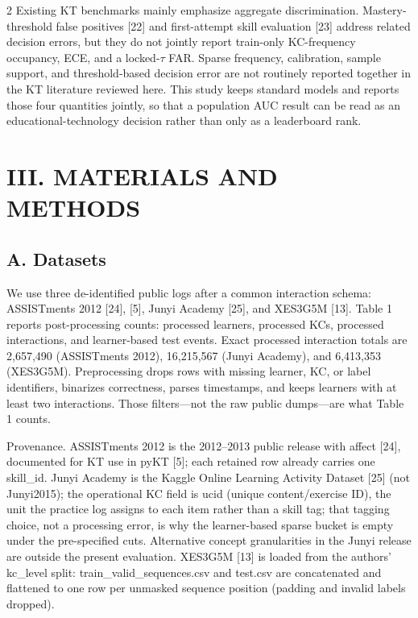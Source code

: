 \documentclass[10pt,a4paper]{article}
\begin{document}
\begin{multicols}{2}
Existing KT benchmarks mainly emphasize aggregate discrimination. Mastery-threshold false positives [22] and first-attempt skill evaluation [23] address related decision errors, but they do not jointly report train-only KC-frequency occupancy, ECE, and a locked-$\tau$ FAR. Sparse frequency, calibration, sample support, and threshold-based decision error are not routinely reported together in the KT literature reviewed here. This study keeps standard models and reports those four quantities jointly, so that a population AUC result can be read as an educational-technology decision rather than only as a leaderboard rank.

\section*{\MakeUppercase{III. MATERIALS AND METHODS}}

\subsection*{A. Datasets}

We use three de-identified public logs after a common interaction schema: ASSISTments 2012 [24], [5], Junyi Academy [25], and XES3G5M [13]. Table 1 reports post-processing counts: processed learners, processed KCs, processed interactions, and learner-based test events. Exact processed interaction totals are 2,657,490 (ASSISTments 2012), 16,215,567 (Junyi Academy), and 6,413,353 (XES3G5M). Preprocessing drops rows with missing learner, KC, or label identifiers, binarizes correctness, parses timestamps, and keeps learners with at least two interactions. Those filters---not the raw public dumps---are what Table 1 counts.

 Provenance. ASSISTments 2012 is the 2012--2013 public release with affect [24], documented for KT use in pyKT [5]; each retained row already carries one skill\_id. Junyi Academy is the Kaggle Online Learning Activity Dataset [25] (not Junyi2015); the operational KC field is ucid (unique content/exercise ID), the unit the practice log assigns to each item rather than a skill tag; that tagging choice, not a processing error, is why the learner-based sparse bucket is empty under the pre-specified cuts. Alternative concept granularities in the Junyi release are outside the present evaluation. XES3G5M [13] is loaded from the authors' kc\_level split: train\_valid\_sequences.csv and test.csv are concatenated and flattened to one row per unmasked sequence position (padding and invalid labels dropped).


\end{multicols}
\end{document}

